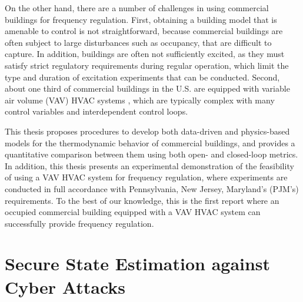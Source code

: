 \documentclass[../thesis.tex]{subfiles}
\begin{document}
On the other hand, there are a number of challenges in using commercial buildings for frequency regulation. 
First, obtaining a building model that is amenable to control is not straightforward, because commercial buildings are often subject to large disturbances such as occupancy, that are difficult to capture. 
In addition, buildings are often not sufficiently excited, as they must satisfy strict regulatory requirements during regular operation, which limit the type and duration of excitation experiments that can be conducted.
Second, about one third of commercial buildings in the U.S. are equipped with variable air volume (VAV) HVAC systems \cite{Hao:2012demandresponse}, which are typically complex with many control variables and interdependent control loops.

This thesis proposes procedures to develop both data-driven and physics-based models for the thermodynamic behavior of commercial buildings, and provides a quantitative comparison between them using both open- and closed-loop metrics. 
In addition, this thesis presents an experimental demonstration of the feasibility of using a VAV HVAC system for frequency regulation, where experiments are conducted in full accordance with Pennsylvania, New Jersey, Maryland's (PJM's) requirements. %
To the best of our knowledge, this is the first report where an occupied commercial building equipped with a VAV HVAC system can successfully provide frequency regulation.






\section{Secure State Estimation against Cyber Attacks}
\end{document}
